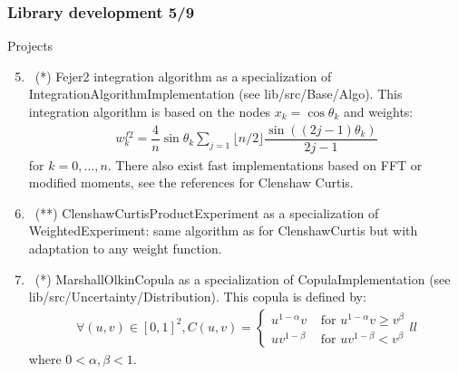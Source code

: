 \documentclass[8pt]{beamer}
\begin{document}
\begin{frame}
  \frametitle{Library development 5/9}
  \begin{block}{Projects}
    \begin{enumerate}
      \setcounter{enumi}{4}
    \item~(*) \alert{\ttfamily Fejer2} integration algorithm as a specialization of  \alert{\ttfamily IntegrationAlgorithmImplementation} (see {\ttfamily lib/src/Base/Algo}). This integration algorithm is based on the nodes $x_k=\cos\theta_k$ and weights:
      \begin{align}
        w_k^{f2}=\dfrac{4}{n}\sin\theta_k\sum_{j=1}{\lfloor n/2\rfloor}\dfrac{\sin\left((2j-1)\theta_k\right)}{2j-1}
      \end{align}
      for $k=0,\dots,n$. There also exist fast implementations based on FFT or modified moments, see the references for Clenshaw Curtis.
    \item~(**) \alert{\ttfamily ClenshawCurtisProductExperiment} as a specialization of {\ttfamily WeightedExperiment}: same algorithm as for {\ttfamily ClenshawCurtis} but with adaptation to any weight function.
    \item~(*) \alert{\ttfamily MarshallOlkinCopula} as a specialization of {\ttfamily CopulaImplementation} (see {\ttfamily lib/src/Uncertainty/Distribution}). This copula is defined by:
      \begin{align}
        \forall (u,v)\in[0,1]^2, C(u, v)=\left\{\begin{array}{ll}
                                                  u^{1-\alpha}v & \mbox{ for }u^{1-\alpha}v\geq v^\beta\\
                                                  uv^{1-\beta} & \mbox{ for }uv^{1-\beta}< v^\beta
                                                \end{array}{ll}
                                                                  \right.
      \end{align}
      where $0<\alpha, \beta<1$.
    \end{enumerate}
  \end{block}
\end{frame}
\end{document}
